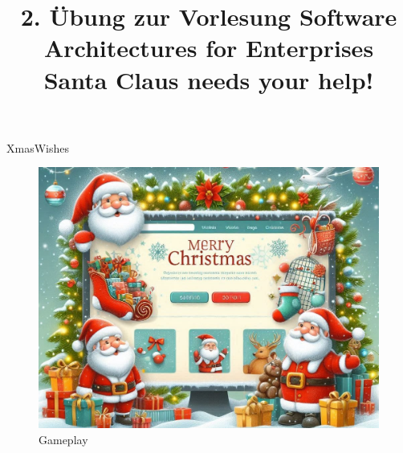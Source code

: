 \documentclass{beamer}
\author[Philipp Geier]{}
\title[]{2. Übung zur Vorlesung
Software Architectures for Enterprises\\
Santa Claus needs your help!}
\institute[Universität Trier]{}
\date[28. Januar 2024]{}
\begin{document}
{
  \begin{frame}
    \maketitle
  \end{frame}
}
    
	

\begin{frame}{XmasWishes \cite{a}}
\begin{figure}
\vspace*{-.8cm}
\hspace*{-1cm}
\includegraphics[width=1.1\paperwidth]{Designer}
\caption{Gameplay}
\end{figure}
\end{frame}
\end{document}
